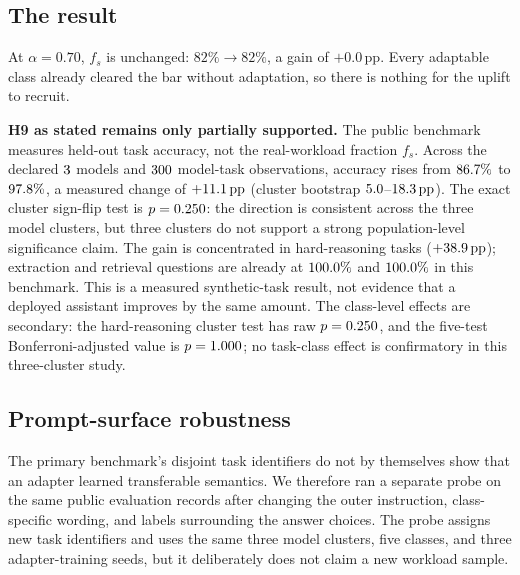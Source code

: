 \documentclass[conference]{IEEEtran}
\newcommand{\fs}{f_{s}}
\newcommand{\pp}{\,\text{pp}}
\begin{document}
\subsection{The result}

At $\alpha = 0.70$, $\fs$ is unchanged: $82\% \rightarrow 82\%$, a gain of
$+0.0\pp$. Every adaptable class already cleared the bar without adaptation, so
there is nothing for the uplift to recruit.

\textbf{H9 as stated remains only partially supported.} The public benchmark
measures held-out task accuracy, not the real-workload fraction $\fs$. Across
the declared $3$ models and $300$
model-task observations, accuracy rises from $86.7\%$ to
$97.8\%$, a measured change of
$+\AdaptationUplift\pp$ (cluster bootstrap
$5.0$--$\AdaptationUpliftHigh\pp$). The exact cluster
sign-flip test is $p=0.250$: the direction is consistent across
the three model clusters, but three clusters do not support a strong
population-level significance claim. The gain is concentrated in hard-reasoning
tasks ($+\AdaptationHardReasonUplift\pp$); extraction and retrieval questions
are already at $100.0\%$ and
$100.0\%$ in this benchmark. This is a measured
synthetic-task result, not evidence
that a deployed assistant improves by the same amount.
The class-level effects are secondary: the hard-reasoning cluster test has
raw $p=0.250$, and the five-test Bonferroni-adjusted value is
$p=1.000$; no task-class effect is confirmatory in
this three-cluster study.

\subsection{Prompt-surface robustness}

The primary benchmark's disjoint task identifiers do not by themselves show
that an adapter learned transferable semantics. We therefore ran a separate
probe on the same public evaluation records after changing the outer
instruction, class-specific wording, and labels surrounding the answer
choices. The probe assigns new task identifiers and uses the same three model
clusters, five classes, and three adapter-training seeds, but it deliberately
does not claim a new workload sample.
\end{document}
